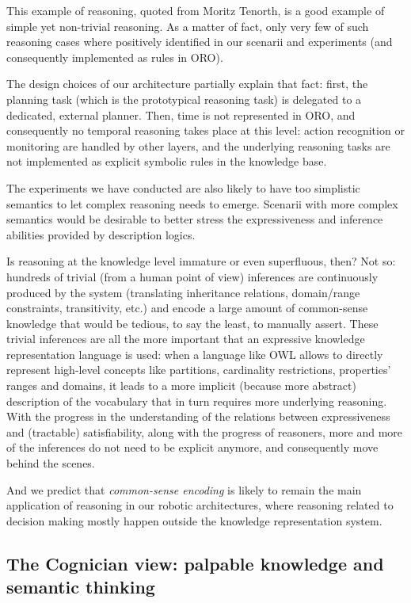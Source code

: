 \documentclass[letterpaper, 10 pt, conference]{ieeeconf}  %
\begin{document}
This example of reasoning, quoted from Moritz Tenorth, is a good example of
simple yet non-trivial reasoning. As a matter of fact, only very few of such
reasoning cases where positively identified in our scenarii and experiments
(and consequently implemented as rules in ORO).

The design choices of our architecture partially explain that fact: first, the
planning task (which is the prototypical reasoning task) is delegated to a
dedicated, external planner. Then, time is not represented in ORO, and
consequently no temporal reasoning takes place at this level: action
recognition or monitoring are handled by other layers, and the underlying
reasoning tasks are not implemented as explicit symbolic rules in the knowledge
base.

The experiments we have conducted are also likely to have too simplistic
semantics to let complex reasoning needs to emerge. Scenarii with more complex
semantics would be desirable to better stress the expressiveness and inference
abilities provided by description logics.

Is reasoning at the knowledge level immature or even superfluous, then? Not so:
hundreds of trivial (from a human point of view) inferences are continuously
produced by the system (translating inheritance relations, domain/range
constraints, transitivity, etc.) and encode a large amount of common-sense
knowledge that would be tedious, to say the least, to manually assert. These
trivial inferences are all the more important that an expressive knowledge
representation language is used: when a language like OWL allows to directly
represent high-level concepts like partitions, cardinality restrictions,
properties' ranges and domains, it leads to a more implicit (because more
abstract) description of the vocabulary that in turn requires more underlying
reasoning. With the progress in the understanding of the relations between
expressiveness and (tractable) satisfiability, along with the progress of
reasoners, more and more of the inferences do not need to be explicit anymore,
and consequently move behind the scenes.

And we predict that \emph{common-sense encoding} is likely to remain the main
application of reasoning in our robotic architectures, where reasoning related
to decision making mostly happen outside the knowledge representation system.


\subsection{The Cognician view: palpable knowledge and semantic thinking}
\end{document}
